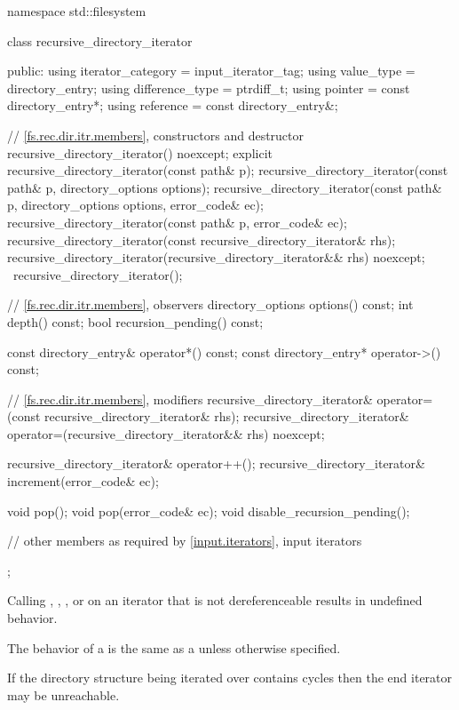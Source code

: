 \begin{codeblock}
namespace std::filesystem {
  class recursive_directory_iterator {
  public:
    using iterator_category = input_iterator_tag;
    using value_type        = directory_entry;
    using difference_type   = ptrdiff_t;
    using pointer           = const directory_entry*;
    using reference         = const directory_entry&;

    // \ref{fs.rec.dir.itr.members}, constructors and destructor
    recursive_directory_iterator() noexcept;
    explicit recursive_directory_iterator(const path& p);
    recursive_directory_iterator(const path& p, directory_options options);
    recursive_directory_iterator(const path& p, directory_options options,
                                 error_code& ec);
    recursive_directory_iterator(const path& p, error_code& ec);
    recursive_directory_iterator(const recursive_directory_iterator& rhs);
    recursive_directory_iterator(recursive_directory_iterator&& rhs) noexcept;
    ~recursive_directory_iterator();

    // \ref{fs.rec.dir.itr.members}, observers
    directory_options  options() const;
    int                depth() const;
    bool               recursion_pending() const;

    const directory_entry& operator*() const;
    const directory_entry* operator->() const;

    // \ref{fs.rec.dir.itr.members}, modifiers
    recursive_directory_iterator&
      operator=(const recursive_directory_iterator& rhs);
    recursive_directory_iterator&
      operator=(recursive_directory_iterator&& rhs) noexcept;

    recursive_directory_iterator& operator++();
    recursive_directory_iterator& increment(error_code& ec);

    void pop();
    void pop(error_code& ec);
    void disable_recursion_pending();

    // other members as required by \ref{input.iterators}, input iterators
  };
}
\end{codeblock}

\pnum
Calling , , ,
 or 
on an iterator that is not dereferenceable results in undefined behavior.

\pnum
The behavior of a  is the same
as a  unless otherwise specified.

\pnum
\begin{note}
If the directory structure being iterated over contains cycles
then the end iterator may be unreachable.
\end{note}

